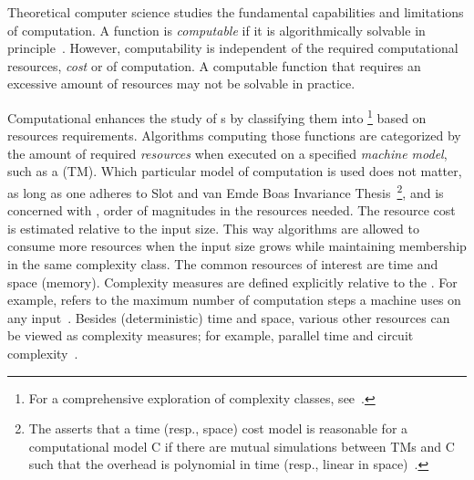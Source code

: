 Theoretical computer science studies the fundamental capabilities and limitations of computation.
A function is \emph{computable} if it is algorithmically solvable in principle~\cite[\mbox{p. 234}]{sipser2012}.
However, computability is independent of the required computational resources, \ie \emph{cost} or \emph{} of computation.
A computable function that requires an excessive amount of resources may not be solvable in practice.

Computational  enhances the study of s by classifying them into \emph{}\footnote{For a comprehensive exploration of complexity classes, see~\textcite{complexityzoo}.}
based on resources requirements.
Algorithms computing those functions are categorized by the amount of required \emph{resources} when executed on a specified \emph{machine model}, such as a  (TM).
Which particular model of computation is used does not matter, as long as one adheres to Slot and van Emde Boas Invariance Thesis~\cite{slot1984}\footnote{
    The  asserts that a time (resp., space) cost model is reasonable for a computational model C if there are mutual simulations between TMs and C such that the overhead is polynomial in time (resp., linear in space)~\cite{vanoni2022}.},
and is concerned with , \ie order of magnitudes in the resources needed.
The resource cost is estimated relative to the input size.
This way algorithms are allowed to consume more resources when the input size grows while maintaining membership in the same complexity class.
The common resources of interest are time and space (memory).
Complexity measures are defined explicitly relative to the .
For example,  refers to the maximum number of computation steps a machine
uses on any input~\cite[p. 276]{sipser2012}.
Besides (deterministic) time and space, various other resources can be viewed as complexity measures;
for example, parallel time and circuit complexity~\cite[p. 428]{sipser2012}.

